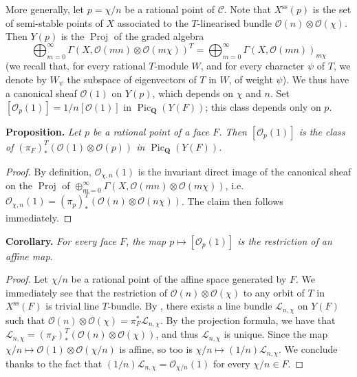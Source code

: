 \documentclass{article}
\newenvironment{itenv}[1]
  {\phantomsection\par\medskip\noindent\textbf{#1.}\itshape}
  {\par\medskip}
\newcommand{\scr}[1]{{\mathscr{#1}}}
\newcommand{\QQ}{\mathbf{Q}}
\renewcommand{\ss}{\mathrm{ss}}
\DeclareMathOperator{\Pic}{Pic}
\DeclareMathOperator{\Proj}{Proj}
\newcommand{\oldpage}[1]{\marginpar{\footnotesize$\Big\vert$ \textit{p.~#1}}}
\begin{document}
More generally, let $p=\chi/n$ be a rational point of $\mathcal{C}$.
Note that $X^\ss(p)$ is the set of semi-stable points of $X$ associated to the
\oldpage{514}
$T$-linearised bundle $\scr{O}(n)\otimes\scr{O}(\chi)$.
Then $Y(p)$ is the $\Proj$ of the graded algebra
\[
  \bigoplus_{m=0}^\infty \Gamma(X,\scr{O}(mn)\otimes\scr{O}(m\chi))^T = \bigoplus_{m=0}^\infty \Gamma(X,\scr{O}(mn))_{m\chi}
\]
(we recall that, for every rational $T$-module $W$, and for every character $\psi$ of $T$, we denote by $W_\psi$ the subspace of eigenvectors of $T$ in $W$, of weight $\psi$).
We thus have a canonical sheaf $\scr{O}(1)$ on $Y(p)$, which depends on $\chi$ and $n$.
Set $[\scr{O}_p(1)] = 1/n[\scr{O}(1)]$ in $\Pic_\QQ(Y(F))$;
this class depends only on $p$.

\begin{itenv}{Proposition}
  Let $p$ be a rational point of a face $F$.
  Then $[\scr{O}_p(1)]$ is the class of $(\pi_F)_*^T(\scr{O}(1)\otimes\scr{O}(p))$ in $\Pic_\QQ(Y(F))$.
\end{itenv}

\begin{proof}
  By definition, $\scr{O}_{\chi,n}(1)$ is the invariant direct image of the canonical sheaf on the $\Proj$ of $\oplus_{m=0}^\infty\Gamma(X,\scr{O}(mn)\otimes\scr{O}(m\chi))$, i.e. $\scr{O}_{\chi,n}(1) = (\pi_p)_*^T(\scr{O}(n)\otimes\scr{O}(n\chi))$.
  The claim then follows immediately.
\end{proof}

\begin{itenv}{Corollary}
  For every face $F$, the map $p\mapsto[\scr{O}_p(1)]$ is the restriction of an affine map.
\end{itenv}

\begin{proof}
  Let $\chi/n$ be a rational point of the affine space generated by $F$.
  We immediately see that the restriction of $\scr{O}(n)\otimes\scr{O}(\chi)$ to any orbit of $T$ in $X^\ss(F)$ is trivial line $T$-bundle.
  By \cite[Proposition~3]{Kra2}, there exists a line bundle $\scr{L}_{n,\chi}$ on $Y(F)$ such that $\scr{O}(n)\otimes\scr{O}(\chi)=\pi_F^*\scr{L}_{n,\chi}$.
  By the projection formula, we have that $\scr{L}_{n,\chi}=(\pi_F)_*^T(\scr{O}(n)\otimes\scr{O}(\chi))$, and thus $\scr{L}_{n,\chi}$ is unique.
  Since the map $\chi/n\mapsto\scr{O}(1)\otimes\scr{O}(\chi/n)$ is affine, so too is $\chi/n\mapsto(1/n)\scr{L}_{n,\chi}$.
  We conclude thanks to the fact that $(1/n)\scr{L}_{n,\chi}=\scr{O}_{\chi/n}(1)$ for every $\chi/n\in F$.
\end{proof}
\end{document}
